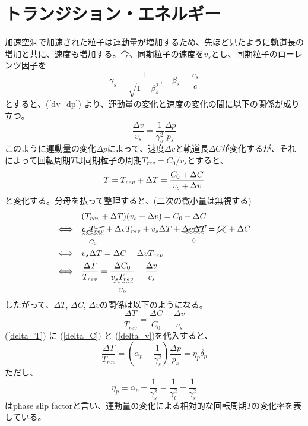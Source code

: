 \documentclass[10pt,a4paper]{ltjsarticle}
\begin{document}
\section{トランジション・エネルギー}
加速空洞で加速された粒子は運動量が増加するため、先ほど見たように軌道長の増加と共に、速度も増加する。今、同期粒子の速度を$v_s$とし、同期粒子のローレンツ因子を
%
\begin{equation}
  \gamma_s = \frac{1}{\sqrt{1 - \beta_s^2}}, \quad \beta_s = \frac{v_s}{c}
\end{equation}
%
とすると、(\ref{dv_dp}) より、運動量の変化と速度の変化の間に以下の関係が成り立つ。
%
\begin{equation}
  \frac{\Delta v}{v_s}=\frac{1}{\gamma_s^2}\frac{\Delta p}{p_s}
  \label{delta_v}
\end{equation}
%
このように運動量の変化$\Delta p$によって、速度$\Delta v$と軌道長$\Delta C$が変化するが、それによって回転周期$T$は同期粒子の周期$T_{rev}=C_0/v_s$とすると、
%
\begin{equation}
  T = T_{rev} + \Delta T = \frac{C_0 + \Delta C}{v_s + \Delta v} \notag
\end{equation}
%
と変化する。分母を払って整理すると、(二次の微小量は無視する)
%
\begin{align}
  & (T_{rev} + \Delta T)(v_s + \Delta v) = C_0 + \Delta C \notag \\
  \Longleftrightarrow\quad & \underset{C_0}{\uwave{\cancel{v_s T_{rev}}}} + \Delta v T_{rev} + v_s \Delta T +
  \underset{0}{\uwave{\cancel{\Delta v \Delta T}}}
  = \cancel{C_0} + \Delta C \notag \\
  \Longleftrightarrow\quad & v_s \Delta T = \Delta C- \Delta v T_{rev} \notag \\
  \Longleftrightarrow\quad & \frac{\Delta T}{T_{rev}} = \frac{\Delta C_0}{\underset{C_0}{\uwave{v_s T_{rev}}}} - \frac{\Delta v}{v_s} \notag
\end{align}
%
したがって、$\Delta T$, $\Delta C$, $\Delta v$の関係は以下のようになる。
%
\begin{equation}
  \frac{\Delta T}{T_{rev}} = \frac{\Delta C}{C_0} - \frac{\Delta v}{v_s}
  \label{delta_T}
\end{equation}
%
(\ref{delta_T}) に (\ref{delta_C}) と (\ref{delta_v})を代入すると、
%
\begin{equation}
  \frac{\Delta T}{T_{rev}} = \left(\alpha_p - \frac{1}{\gamma_s^2}\right)\frac{\Delta p}{p_s} = \eta_p \delta_p
  \label{deltat_eta_deltap}
\end{equation}
%
ただし、
%
\begin{equation}
  \eta_p \equiv \alpha_p - \frac{1}{\gamma_s^2} = \frac{1}{\gamma_t^2} - \frac{1}{\gamma_s^2}
  \label{alppha_slip}
\end{equation}
%
はphase slip factorと言い、運動量の変化による相対的な回転周期$T$の変化率を表している。
%
\end{document}
